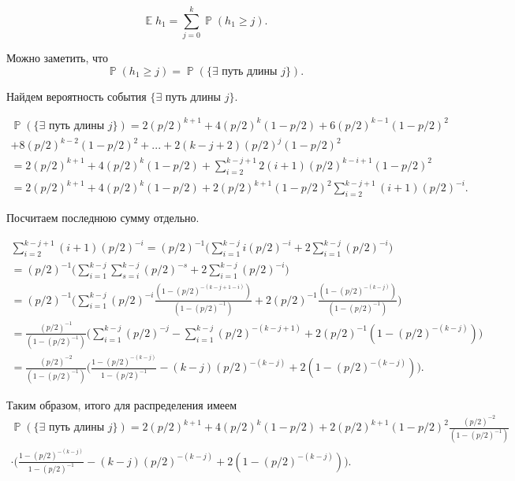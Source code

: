 \documentclass[10pt, reqno]{amsart}
\DeclareMathOperator*{\E}{\mathbb{E}}
\DeclareMathOperator*{\Pb}{\mathbb{P}}
\begin{document}
  \begin{equation*}
      \E h_{1} = \sum_{j=0}^{k}\Pb(h_{1} \geq j).
  \end{equation*}
  
  Можно заметить, что 
  \begin{equation*}
      \Pb(h_{1} \geq j) = \Pb(\{\exists \text{ путь длины } j\}).
  \end{equation*}
  
  Найдем вероятность события $\{\exists \text{ путь длины } j\}$.
  
  \begin{align*}
     \Pb(\{\exists \text{ путь длины } j\}) = 2(p/2)^{k+1} + 4(p/2)^{k}(1-p/2) + 6(p/2)^{k-1}(1-p/2)^{2} \\ + 8(p/2)^{k-2}(1-p/2)^{2} + ... + 2(k-j+2)(p/2)^{j}(1-p/2)^{2} \\ = 2(p/2)^{k+1} + 4(p/2)^{k}(1-p/2) + \sum_{i=2}^{k-j+1}2(i+1)(p/2)^{k-i+1}(1-p/2)^{2} \\ = 2(p/2)^{k+1} + 4(p/2)^{k}(1-p/2) + 2(p/2)^{k+1}(1-p/2)^{2}\sum_{i=2}^{k-j+1}(i+1)(p/2)^{-i}.
  \end{align*}
  
  Посчитаем последнюю сумму отдельно.
  
  \begin{align*}
     \sum_{i=2}^{k-j+1}(i+1)(p/2)^{-i} = (p/2)^{-1}\Big(\sum_{i=1}^{k-j}i(p/2)^{-i} + 2\sum_{i=1}^{k-j}(p/2)^{-i}\Big) \\ = (p/2)^{-1}\Big(\sum_{i=1}^{k-j}\sum_{s=i}^{k-j}(p/2)^{-s} + 2\sum_{i=1}^{k-j}(p/2)^{-i}\Big) \\ = (p/2)^{-1}\Big(\sum_{i=1}^{k-j}(p/2)^{-i}\frac{(1-(p/2)^{-(k-j+1-i)})}{(1-(p/2)^{-1})} + 2(p/2)^{-1}\frac{(1-(p/2)^{-(k-j)})}{(1-(p/2)^{-1})}\Big) \\ = \frac{(p/2)^{-1}}{(1-(p/2)^{-1})}\Big(\sum_{i=1}^{k-j}(p/2)^{-j} - \sum_{i=1}^{k-j}(p/2)^{-(k-j+1)} + 2(p/2)^{-1}(1-(p/2)^{-(k-j)})\Big) \\ = \frac{(p/2)^{-2}}{(1-(p/2)^{-1})}\Big(\frac{1-(p/2)^{-(k-j)}}{1-(p/2)^{-1}} - (k-j)(p/2)^{-(k-j)} + 2(1-(p/2)^{-(k-j)})\Big).
  \end{align*}
  
  Таким образом, итого для распределения имеем
  \begin{align*}
      \Pb(\{\exists \text{ путь длины } j\}) = 2(p/2)^{k+1} + 4(p/2)^{k}(1-p/2) + 2(p/2)^{k+1}(1-p/2)^{2}\frac{(p/2)^{-2}}{(1-(p/2)^{-1})}\\\cdot\Big(\frac{1-(p/2)^{-(k-j)}}{1-(p/2)^{-1}} - (k-j)(p/2)^{-(k-j)} + 2(1-(p/2)^{-(k-j)})\Big).
  \end{align*}
  
\end{document}
